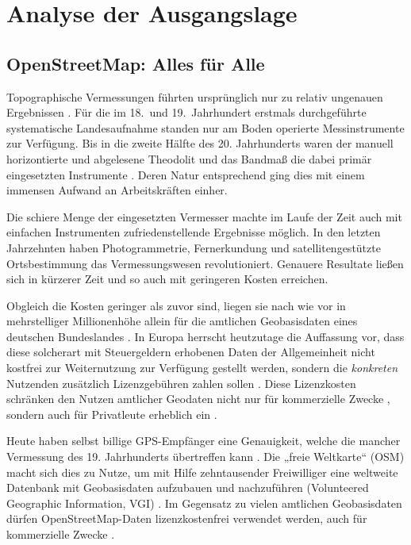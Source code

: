 \documentclass[../main/thesis.tex]{subfiles}
\begin{document}
\chapter{Analyse der Ausgangslage}

\section{OpenStreetMap: Alles für Alle}
Topographische Vermessungen führten ursprünglich nur zu relativ ungenauen Ergebnissen . Für die im 18.~und 19.~Jahrhundert erstmals durchgeführte systematische Landesaufnahme standen nur am Boden operierte Messinstrumente zur Verfügung. Bis in die zweite Hälfte des 20. Jahrhunderts waren der manuell horizontierte und abgelesene Theodolit und das Bandmaß die dabei primär eingesetzten Instrumente . Deren Natur entsprechend ging dies mit einem immensen Aufwand an Arbeitskräften einher.

Die schiere Menge der eingesetzten Vermesser machte im Laufe der Zeit auch mit einfachen Instrumenten zufriedenstellende Ergebnisse möglich. In den letzten Jahrzehnten haben Photogrammetrie, Fernerkundung und satellitengestützte Ortsbestimmung das Vermessungswesen revolutioniert. Genauere Resultate ließen sich in kürzerer Zeit und so auch mit geringeren Kosten erreichen. \noref


Obgleich die Kosten geringer als zuvor sind, liegen sie nach wie vor in mehrstelliger Millionenhöhe allein für die amtlichen Geobasisdaten eines deutschen Bundeslandes .
In Europa \noref herrscht heutzutage  die Auffassung vor, dass diese solcherart mit Steuergeldern erhobenen Daten der Allgemeinheit nicht kostfrei zur Weiternutzung zur Verfügung gestellt werden, sondern die \emph{konkreten} Nutzenden zusätzlich Lizenzgebühren zahlen sollen \noref. Diese Lizenzkosten schränken den Nutzen amtlicher Geodaten nicht nur für kommerzielle Zwecke , sondern auch für Privatleute \noref erheblich ein \noref.


Heute haben selbst billige GPS-Empfänger eine Genauigkeit, welche die mancher Vermessung des 19. Jahrhunderts übertreffen kann . Die „freie Weltkarte“  (OSM)  macht sich dies zu Nutze, um mit Hilfe zehntausender Freiwilliger eine weltweite Datenbank mit Geobasisdaten aufzubauen und nachzuführen (Volunteered Geographic Information, VGI) . Im Gegensatz zu vielen amtlichen Geobasisdaten dürfen OpenStreetMap-Daten lizenzkostenfrei verwendet werden, auch für kommerzielle Zwecke .
\end{document}
